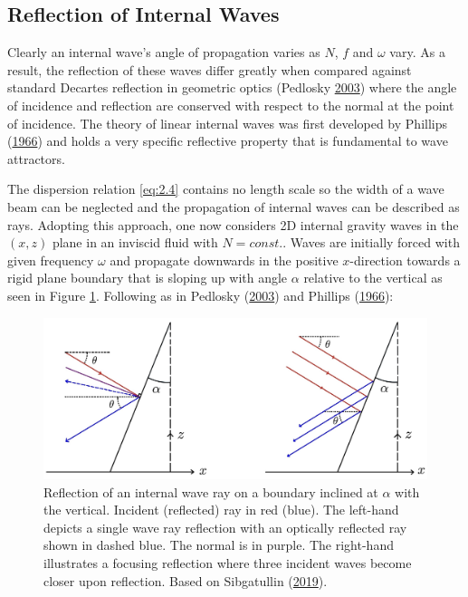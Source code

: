 \documentclass[a4paper]{article}
\numberwithin{equation}{section}
\begin{document}
\subsection{Reflection of Internal Waves}
Clearly an internal wave's angle of propagation varies as $N$, $f$ and $\omega$ vary. As a result, the reflection of these waves differ greatly when compared against standard Decartes reflection in geometric optics (Pedlosky \hyperlink{ref 1}{2003}) where the angle of incidence and reflection are conserved with respect to the normal at the point of incidence. The theory of linear internal waves was first developed by Phillips (\hyperlink{ref 7}{1966}) and holds a very specific reflective property that is fundamental to wave attractors. 

The dispersion relation \eqref{eq:2.4} contains no length scale so the width of a wave beam can be neglected and the propagation of internal waves can be described as rays. Adopting this approach, one now considers 2D internal gravity waves in the $(x, z)$ plane in an inviscid fluid with $N = const.$. Waves are initially forced with given frequency $\omega$ and propagate downwards in the positive $x$-direction towards a rigid plane boundary that is sloping up with angle $\alpha$ relative to the vertical as seen in Figure \ref{fig:2}. Following as in Pedlosky (\hyperlink{ref 1}{2003}) and Phillips (\hyperlink{ref 7}{1966}):
\begin{figure}[h!]
  \includegraphics[scale=0.13, center]{Images/reflection.jpg}
  \caption{Reflection of an internal wave ray on a boundary inclined at $\alpha$ with the vertical. Incident (reflected) ray in red (blue). The left-hand depicts a single wave ray reflection with an optically reflected ray shown in dashed blue. The normal is in purple. The right-hand illustrates a focusing reflection where three incident waves become closer upon reflection. Based on Sibgatullin (\protect\hyperlink{ref 19}{2019}).}
  \label{fig:2}
\end{figure}\\
\end{document}
